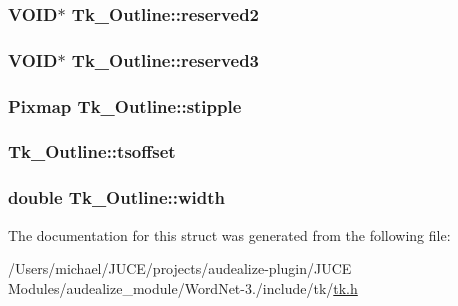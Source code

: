 \subsubsection[{\texorpdfstring{reserved2}{reserved2}}]{\setlength{\rightskip}{0pt plus 5cm}V\+O\+ID$\ast$ Tk\+\_\+\+Outline\+::reserved2}\hypertarget{struct_tk___outline_a31ae2768cfa61e05cb7f792a47cb22cd}{}\label{struct_tk___outline_a31ae2768cfa61e05cb7f792a47cb22cd}
\subsubsection[{\texorpdfstring{reserved3}{reserved3}}]{\setlength{\rightskip}{0pt plus 5cm}V\+O\+ID$\ast$ Tk\+\_\+\+Outline\+::reserved3}\hypertarget{struct_tk___outline_a62836603a85a2d0cfbe1626105c7c8d9}{}\label{struct_tk___outline_a62836603a85a2d0cfbe1626105c7c8d9}
\subsubsection[{\texorpdfstring{stipple}{stipple}}]{\setlength{\rightskip}{0pt plus 5cm}Pixmap Tk\+\_\+\+Outline\+::stipple}\hypertarget{struct_tk___outline_a6e54c1b95e3199debb0a3f9a330b92f8}{}\label{struct_tk___outline_a6e54c1b95e3199debb0a3f9a330b92f8}
\subsubsection[{\texorpdfstring{tsoffset}{tsoffset}}]{ Tk\+\_\+\+Outline\+::tsoffset}\hypertarget{struct_tk___outline_ae94964d53046bb4ad5325b804e62a64d}{}\label{struct_tk___outline_ae94964d53046bb4ad5325b804e62a64d}
\subsubsection[{\texorpdfstring{width}{width}}]{\setlength{\rightskip}{0pt plus 5cm}double Tk\+\_\+\+Outline\+::width}\hypertarget{struct_tk___outline_a7b475a2386ac7bff182f0231673cd609}{}\label{struct_tk___outline_a7b475a2386ac7bff182f0231673cd609}


The documentation for this struct was generated from the following file\+:\begin{DoxyCompactItemize}
\item 
/\+Users/michael/\+J\+U\+C\+E/projects/audealize-\/plugin/\+J\+U\+C\+E Modules/audealize\+\_\+module/\+Word\+Net-\/3./include/tk/\hyperlink{tk_8h}{tk.\+h}\end{DoxyCompactItemize}

